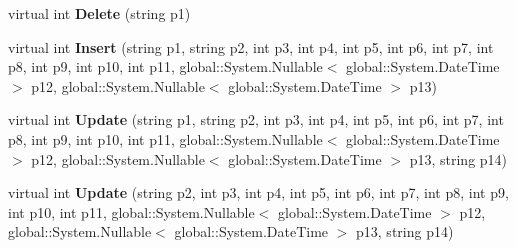\begin{DoxyCompactItemize}
\item 
virtual int {\bfseries Delete} (string p1)\hypertarget{class_products_1_1_data_1_1ds_sage_table_adapters_1_1ta___kunde_a93aaeea8dd45a9379469e3ea23c061a1}{}\label{class_products_1_1_data_1_1ds_sage_table_adapters_1_1ta___kunde_a93aaeea8dd45a9379469e3ea23c061a1}

\item 
virtual int {\bfseries Insert} (string p1, string p2, int p3, int p4, int p5, int p6, int p7, int p8, int p9, int p10, int p11, global\+::\+System.\+Nullable$<$ global\+::\+System.\+Date\+Time $>$ p12, global\+::\+System.\+Nullable$<$ global\+::\+System.\+Date\+Time $>$ p13)\hypertarget{class_products_1_1_data_1_1ds_sage_table_adapters_1_1ta___kunde_a6392d693ccdbb2b28af5fbcb79414dfe}{}\label{class_products_1_1_data_1_1ds_sage_table_adapters_1_1ta___kunde_a6392d693ccdbb2b28af5fbcb79414dfe}

\item 
virtual int {\bfseries Update} (string p1, string p2, int p3, int p4, int p5, int p6, int p7, int p8, int p9, int p10, int p11, global\+::\+System.\+Nullable$<$ global\+::\+System.\+Date\+Time $>$ p12, global\+::\+System.\+Nullable$<$ global\+::\+System.\+Date\+Time $>$ p13, string p14)\hypertarget{class_products_1_1_data_1_1ds_sage_table_adapters_1_1ta___kunde_af4a71d7efd07132d8598ee8fb701cf3c}{}\label{class_products_1_1_data_1_1ds_sage_table_adapters_1_1ta___kunde_af4a71d7efd07132d8598ee8fb701cf3c}

\item 
virtual int {\bfseries Update} (string p2, int p3, int p4, int p5, int p6, int p7, int p8, int p9, int p10, int p11, global\+::\+System.\+Nullable$<$ global\+::\+System.\+Date\+Time $>$ p12, global\+::\+System.\+Nullable$<$ global\+::\+System.\+Date\+Time $>$ p13, string p14)\hypertarget{class_products_1_1_data_1_1ds_sage_table_adapters_1_1ta___kunde_aabf3dae1590f365992e6639e86e0edbe}{}\label{class_products_1_1_data_1_1ds_sage_table_adapters_1_1ta___kunde_aabf3dae1590f365992e6639e86e0edbe}

\end{DoxyCompactItemize}
